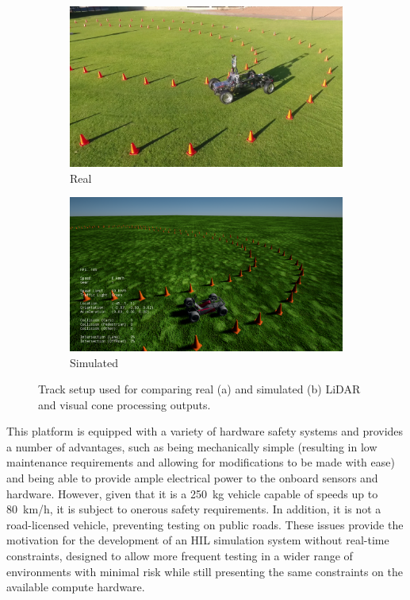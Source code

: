 \begin{figure}[H]
	\centering
	\begin{subfigure}[b]{0.45\textwidth}
		\includegraphics[width=\textwidth]{trackReal}
		\caption{Real}
		\label{fig:8:tracks:real}   
	\end{subfigure} 
	\hspace{1em}         
	\begin{subfigure}[b]{0.45\textwidth}
		\includegraphics[width=\textwidth]{trackSim}
		\caption{Simulated}
		\label{fig:8:tracks:sim}
	\end{subfigure}             
	\caption[Experimental track setup]{Track setup used for comparing real (a) and simulated (b) LiDAR and visual cone processing outputs.}
	\label{fig:8:tracks}
\end{figure}

This platform is equipped with a variety of hardware safety systems and provides a number of advantages, such as being mechanically simple (resulting in low maintenance requirements and allowing for modifications to be made with ease) and being able to provide ample electrical power to the onboard sensors and hardware.
However, given that it is a 250~kg vehicle capable of speeds up to 80~km/h, it is subject to onerous safety requirements.
In addition, it is not a road-licensed vehicle, preventing testing on public roads.
These issues provide the motivation for the development of an HIL simulation system without real-time constraints, designed to allow more frequent testing in a wider range of environments with minimal risk while still presenting the same constraints on the available compute hardware.


